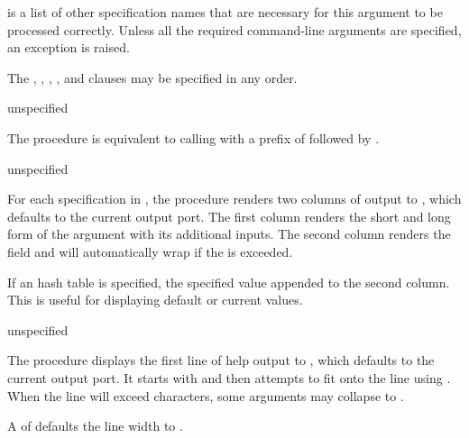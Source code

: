  is a list of other specification names that are
necessary for this argument to be processed correctly. Unless all the
required command-line arguments are specified, an exception is raised.

The , , , ,
and  clauses may be specified in any order.

\begin{procedure}
\end{procedure}
\returns{} unspecified

The  procedure is equivalent to calling
 with a prefix of  followed by
.

\begin{procedure}
\end{procedure}
\returns{} unspecified

For each specification in , the 
procedure renders two columns of output to , which defaults to
the current output port. The first column renders the short and long
form of the argument with its additional inputs. The second column
renders the   field and will automatically
wrap if the  is exceeded.

If an  hash table is specified, the specified value appended
to the second column. This is useful for displaying default or current
values.

\begin{procedure}
\end{procedure}
\returns{} unspecified

The  procedure displays the first line of help
output to , which defaults to the current output port. It
starts with  and  then attempts to fit
 onto the line using . When the line will
exceed  characters, some arguments may collapse to
\code{[options]}.

A  of  defaults the line width to
.

